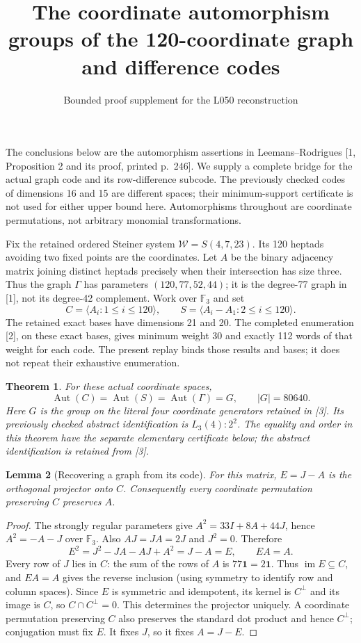 \documentclass[11pt]{article}
\title{The coordinate automorphism groups of the 120-coordinate graph and difference codes}
\author{Bounded proof supplement for the L050 reconstruction}
\date{}
\newtheorem{theorem}{Theorem}\newtheorem{lemma}[theorem]{Lemma}
\newcommand{\F}{\mathbb F}\newcommand{\Aut}{\operatorname{Aut}}
\begin{document}
\maketitle
\noindent The conclusions below are the automorphism assertions in Leemans--Rodrigues [1, Proposition 2 and its proof, printed p.\ 246]. We supply a complete bridge for the actual graph code and its row-difference subcode. The previously checked codes of dimensions 16 and 15 are different spaces; their minimum-support certificate is not used for either upper bound here. Automorphisms throughout are coordinate permutations, not arbitrary monomial transformations.

Fix the retained ordered Steiner system $\mathcal W=S(4,7,23)$. Its 120 heptads avoiding two fixed points are the coordinates. Let $A$ be the binary adjacency matrix joining distinct heptads precisely when their intersection has size three. Thus the graph $\Gamma$ has parameters $(120,77,52,44)$; it is the degree-77 graph in [1], not its degree-42 complement. Work over $\F_3$ and set
\[
 C=\langle A_i:1\le i\le120\rangle,\qquad
 S=\langle A_i-A_1:2\le i\le120\rangle.
\]
The retained exact bases have dimensions 21 and 20. The completed enumeration [2], on these exact bases, gives minimum weight 30 and exactly 112 words of that weight for each code. The present replay binds those results and bases; it does not repeat their exhaustive enumeration.

\begin{theorem}\label{main}
For these actual coordinate spaces,
\[
 \Aut(C)=\Aut(S)=\Aut(\Gamma)=G,\qquad |G|=80640.
\]
Here $G$ is the group on the literal four coordinate generators retained in [3]. Its previously checked abstract identification is $L_3(4):2^2$. The equality and order in this theorem have the separate elementary certificate below; the abstract identification is retained from [3].
\end{theorem}

\begin{lemma}[Recovering a graph from its code]\label{projection}
For this matrix, $E=J-A$ is the orthogonal projector onto $C$. Consequently every coordinate permutation preserving $C$ preserves $A$.
\end{lemma}
\begin{proof}
The strongly regular parameters give $A^2=33I+8A+44J$, hence $A^2=-A-J$ over $\F_3$. Also $AJ=JA=2J$ and $J^2=0$. Therefore
\[
 E^2=J^2-JA-AJ+A^2=J-A=E,\qquad EA=A.
\]
Every row of $J$ lies in $C$: the sum of the rows of $A$ is $77\mathbf1=2\mathbf1$. Thus $\operatorname{im}E\subseteq C$, and $EA=A$ gives the reverse inclusion (using symmetry to identify row and column spaces). Since $E$ is symmetric and idempotent, its kernel is $C^\perp$ and its image is $C$, so $C\cap C^\perp=0$. This determines the projector uniquely. A coordinate permutation preserving $C$ also preserves the standard dot product and hence $C^\perp$; conjugation must fix $E$. It fixes $J$, so it fixes $A=J-E$.
\end{proof}
\end{document}

